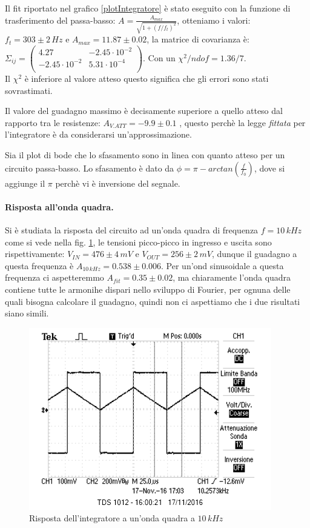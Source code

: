 \documentclass[10pt,a4paper]{article}
\begin{document}
Il fit riportato nel grafico \ref{plotIntegratore} è stato eseguito con la funzione di trasferimento del passa-basso: $ A=\frac{A_{max}}{\sqrt{1+(f/f_t)^2}}$, otteniamo i valori: $f_t = 303 \pm 2 \, Hz$ e $A_{max} = 11.87 \pm 0.02$, la matrice di covarianza è: $ \Sigma_{ij} = \left( \begin{array}{cc}
4.27 & -2.45 \cdot 10^{-2} \\ 
-2.45 \cdot 10^{-2} & 5.31 \cdot 10^{-4}\\
\end{array} \right)$. 
Con un $\chi^2/ndof = 1.36/7$.\\
Il $\chi^2$ è inferiore al valore atteso questo significa che gli errori sono stati sovrastimati. 

Il valore del guadagno massimo è decisamente superiore a quello atteso dal rapporto tra le resistenze: $A_{V.ATT}= -9.9 \pm 0.1$ , questo perchè la legge \emph{fittata} per l'integratore è da considerarsi un'approssimazione.

Sia il plot di bode che lo sfasamento sono in linea con quanto atteso per un circuito passa-basso. Lo sfasamento è dato da $\phi = \pi - arctan \left( \frac{f}{f_0} \right)$, dove si aggiunge il $\pi$ perchè vi è inversione del segnale.


\paragraph{Risposta all'onda quadra.} Si è studiata la risposta del circuito ad un'onda quadra di frequenza $f = 10 \, kHz$ come si vede nella fig. \ref{integratore10}, le tensioni picco-picco in ingresso e uscita sono rispettivamente: $V_{IN} = 476 \pm 4 \, mV$ e $V_{OUT} = 256 \pm 2 \, mV$, dunque il guadagno a questa frequenza è $A_{10\, kHz} = 0.538 \pm 0.006$. Per un'ond sinusoidale a questa frequenza ci aspetteremmo $A_{fit} = 0.35 \pm 0.02$, ma chiaramente l'onda quadra contiene tutte le armonihe dispari nello sviluppo di Fourier, per ognuna delle quali bisogna calcolare il guadagno, quindi non ci aspettiamo che i due risultati siano simili.

\begin{figure}[!htb]
\centering
  \includegraphics[scale=1.0]{immagini/integratore.png}
\caption{Risposta dell'integratore a un'onda quadra a $10\,kHz$}
\label{integratore10}
\end{figure}
\end{document}
